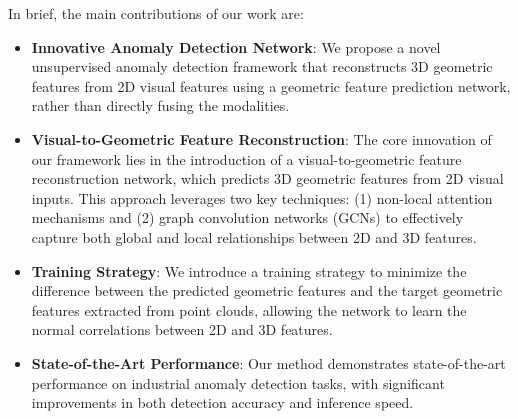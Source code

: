 In brief, the main contributions of our work are:

\begin{itemize}
    \item \textbf{Innovative Anomaly Detection Network}: We propose a novel unsupervised anomaly detection framework that reconstructs 3D geometric features from 2D visual features using a geometric feature prediction network, rather than directly fusing the modalities.

    \item \textbf{Visual-to-Geometric Feature Reconstruction}: The core innovation of our framework lies in the introduction of a visual-to-geometric feature reconstruction network, which predicts 3D geometric features from 2D visual inputs. This approach leverages two key techniques: (1) non-local attention mechanisms and (2) graph convolution networks (GCNs) to effectively capture both global and local relationships between 2D and 3D features.

    \item \textbf{Training Strategy}: We introduce a training strategy to minimize the difference between the predicted geometric features and the target geometric features extracted from point clouds, allowing the network to learn the normal correlations between 2D and 3D features.

    \item \textbf{State-of-the-Art Performance}: Our method demonstrates state-of-the-art performance on industrial anomaly detection tasks, with significant improvements in both detection accuracy and inference speed.
\end{itemize}
